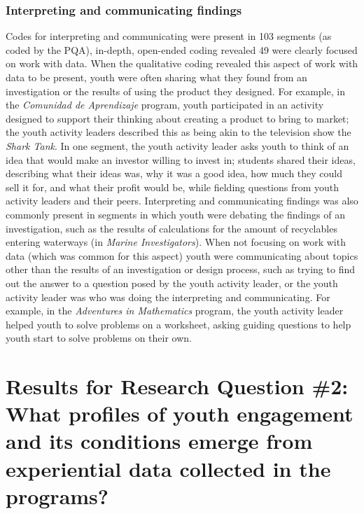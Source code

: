 \documentclass[]{msu-thesis}
\theoremstyle{definition}
\theoremstyle{definition}
\theoremstyle{definition}
\theoremstyle{remark}
\begin{document}
\subsubsection{Interpreting and communicating
findings}\label{interpreting-and-communicating-findings}

Codes for interpreting and communicating were present in 103 segments
(as coded by the PQA), in-depth, open-ended coding revealed 49 were
clearly focused on work with data. When the qualitative coding revealed
this aspect of work with data to be present, youth were often sharing
what they found from an investigation or the results of using the
product they designed. For example, in the \emph{Comunidad de
Aprendizaje} program, youth participated in an activity designed to
support their thinking about creating a product to bring to market; the
youth activity leaders described this as being akin to the television
show the \emph{Shark Tank}. In one segment, the youth activity leader
asks youth to think of an idea that would make an investor willing to
invest in; students shared their ideas, describing what their ideas was,
why it was a good idea, how much they could sell it for, and what their
profit would be, while fielding questions from youth activity leaders
and their peers. Interpreting and communicating findings was also
commonly present in segments in which youth were debating the findings
of an investigation, such as the results of calculations for the amount
of recyclables entering waterways (in \emph{Marine Investigators}). When
not focusing on work with data (which was common for this aspect) youth
were communicating about topics other than the results of an
investigation or design process, such as trying to find out the answer
to a question posed by the youth activity leader, or the youth activity
leader was who was doing the interpreting and communicating. For
example, in the \emph{Adventures in Mathematics} program, the youth
activity leader helped youth to solve problems on a worksheet, asking
guiding questions to help youth start to solve problems on their own.

\section{Results for Research Question \#2: What profiles of youth
engagement and its conditions emerge from experiential data collected in
the
programs?}\label{results-for-research-question-2-what-profiles-of-youth-engagement-and-its-conditions-emerge-from-experiential-data-collected-in-the-programs}
\end{document}
